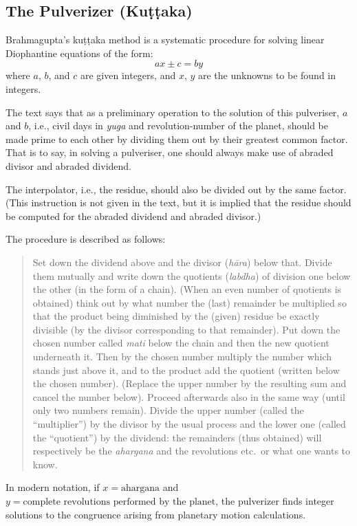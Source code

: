 \documentclass[11pt,a4paper]{article}
\theoremstyle{definition}
\begin{document}
\subsection{The Pulverizer (Ku\d{t}\d{t}aka)}

Brahmagupta's ku\d{t}\d{t}aka method is a systematic procedure for solving linear Diophantine equations of the form:
\[
ax \pm c = by
\]
where $a$, $b$, and $c$ are given integers, and $x$, $y$ are the unknowns to be found in integers.

The text says that as a preliminary operation to the solution of this pulveriser, $a$ and $b$, i.e., civil days in \textit{yuga} and revolution-number of the planet, should be made prime to each other by dividing them out by their greatest common factor. That is to say, in solving a pulveriser, one should always make use of abraded divisor and abraded dividend.

The interpolator, i.e., the residue, should also be divided out by the same factor. (This instruction is not given in the text, but it is implied that the residue should be computed for the abraded dividend and abraded divisor.)

The procedure is described as follows:

\begin{quote}
Set down the dividend above and the divisor (\textit{h\=ara}) below that. Divide them mutually and write down the quotients (\textit{labdha}) of division one below the other (in the form of a chain). (When an even number of quotients is obtained) think out by what number the (last) remainder be multiplied so that the product being diminished by the (given) residue be exactly divisible (by the divisor corresponding to that remainder). Put down the chosen number called \textit{mati} below the chain and then the new quotient underneath it. Then by the chosen number multiply the number which stands just above it, and to the product add the quotient (written below the chosen number). (Replace the upper number by the resulting sum and cancel the number below). Proceed afterwards also in the same way (until only two numbers remain). Divide the upper number (called the ``multiplier'') by the divisor by the usual process and the lower one (called the ``quotient'') by the dividend: the remainders (thus obtained) will respectively be the \textit{ahargana} and the revolutions etc.\ or what one wants to know.
\end{quote}

In modern notation, if $x = \text{ahargana}$ and $y = \text{complete revolutions performed by the planet}$, the pulverizer finds integer solutions to the congruence arising from planetary motion calculations.
\end{document}
